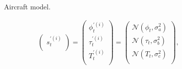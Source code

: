 
\setcounter{subfigure}{0}
\begin{figure}[t!]
\centering
{}
\caption{Aircraft model.}
\label{fig:atm_model}
\end{figure}

\begin{equation}
\begin{aligned}
  \begin{pmatrix}
    s^{\prime(i)}_{t}    \\ 
  \end{pmatrix}
  =
  \begin{pmatrix}
  	\phi^{\prime(i)}_{t} \\
		\tau^{\prime(i)}_{t} \\
		T^{\prime(i)}_{t} \\
  \end{pmatrix}
  =
  \begin{pmatrix}
  	\mathcal{N}(\phi_{t},\sigma_a^2) \\
  	\mathcal{N}(\tau_{t},\sigma_b^2) \\
  	\mathcal{N}(T_{t},\sigma_c^2) \\
  \end{pmatrix}
	\mbox{, }
\end{aligned}
\label{eq:atm_c}
\end{equation}

